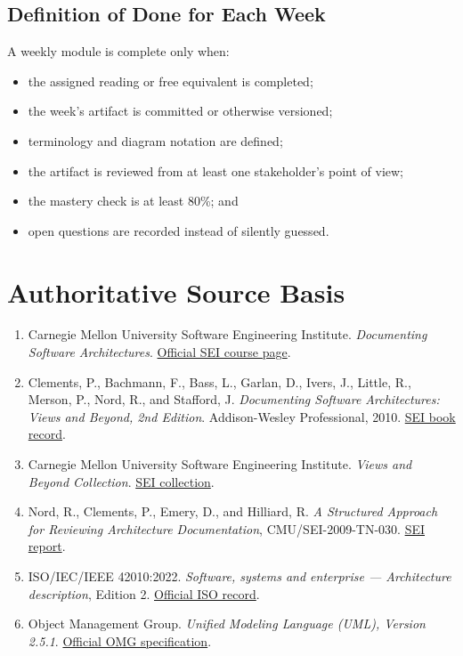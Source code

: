 \documentclass[10pt,letterpaper]{article}
\begin{document}
\subsection{Definition of Done for Each Week}
A weekly module is complete only when:
\begin{itemize}
  \item the assigned reading or free equivalent is completed;
  \item the week's artifact is committed or otherwise versioned;
  \item terminology and diagram notation are defined;
  \item the artifact is reviewed from at least one stakeholder's point of view;
  \item the mastery check is at least 80\%; and
  \item open questions are recorded instead of silently guessed.
\end{itemize}

\section{Authoritative Source Basis}

\begin{enumerate}
  \item Carnegie Mellon University Software Engineering Institute. \emph{Documenting Software Architectures}. \href{https://www.sei.cmu.edu/training/documenting-software-architectures/}{Official SEI course page}.
  \item Clements, P., Bachmann, F., Bass, L., Garlan, D., Ivers, J., Little, R., Merson, P., Nord, R., and Stafford, J. \emph{Documenting Software Architectures: Views and Beyond, 2nd Edition}. Addison-Wesley Professional, 2010. \href{https://www.sei.cmu.edu/library/documenting-software-architectures-views-and-beyond-second-edition/}{SEI book record}.
  \item Carnegie Mellon University Software Engineering Institute. \emph{Views and Beyond Collection}. \href{https://www.sei.cmu.edu/library/views-and-beyond-collection/}{SEI collection}.
  \item Nord, R., Clements, P., Emery, D., and Hilliard, R. \emph{A Structured Approach for Reviewing Architecture Documentation}, CMU/SEI-2009-TN-030. \href{https://www.sei.cmu.edu/library/a-structured-approach-for-reviewing-architecture-documentation/}{SEI report}.
  \item ISO/IEC/IEEE 42010:2022. \emph{Software, systems and enterprise --- Architecture description}, Edition 2. \href{https://www.iso.org/standard/74393.html}{Official ISO record}.
  \item Object Management Group. \emph{Unified Modeling Language (UML), Version 2.5.1}. \href{https://www.omg.org/spec/UML/}{Official OMG specification}.
\end{enumerate}
\end{document}
